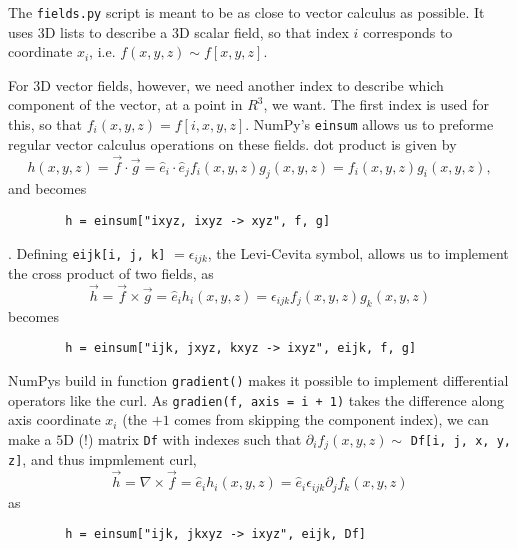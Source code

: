 \documentclass{article}
\begin{document}
    The \verb|fields.py| script is meant to be as close to vector calculus as possible. It uses $3\textrm{D}$ lists to describe a $3\textrm{D}$ scalar field, so that index $i$ corresponds to coordinate $x_i$, i.e. $f(x, y, z) \sim f[x, y, z]$.
    
    For $3\textrm{D}$ vector fields, however, we need another index to describe which component of the vector, at a point in $R^3$, we want. The first index is used for this, so that $f_i(x, y, z) = f[i, x, y, z]$. NumPy's \verb|einsum| allows us to preforme regular vector calculus operations on these fields. dot product is given by
    $$
    h(x, y, z) = \vec f\cdot \vec g = \hat e_i \cdot \hat e_j f_i(x, y, z)  g_j(x, y, z) = f_i(x, y, z)g_i(x, y, z),
    $$
    and becomes
    \begin{verbatim}
        h = einsum["ixyz, ixyz -> xyz", f, g]
    \end{verbatim}.
    Defining \verb|eijk[i, j, k]| $ = \epsilon_{ijk}$, the Levi-Cevita symbol, allows us to implement the cross product of two fields, as
    $$
        \vec h = \vec f \times \vec g = \hat e_i h_i(x, y, z) =  \epsilon_{ijk} f_j(x, y, z) g_k(x, y, z)
    $$
    becomes
    \begin{verbatim}
        h = einsum["ijk, jxyz, kxyz -> ixyz", eijk, f, g]
    \end{verbatim}
    NumPys build in function \verb|gradient()| makes it possible to implement differential operators like the curl. As \verb|gradien(f, axis = i + 1)| takes the difference along axis coordinate $x_i$ (the $+1$ comes from skipping the component index), we can make a $5 \textrm{D}$ (!) matrix \verb|Df| with indexes such that $\partial_i f_j(x, y, z)\sim$ \verb|Df[i, j, x, y, z]|, and thus impmlement curl,
    $$
        \vec h = \nabla \times \vec f = \hat e_i h_i(x, y, z) =  \hat e_i \epsilon_{ijk} \partial_j f_k(x, y, z)
    $$
    as
    \begin{verbatim}
        h = einsum["ijk, jkxyz -> ixyz", eijk, Df]
    \end{verbatim}
\end{document}
